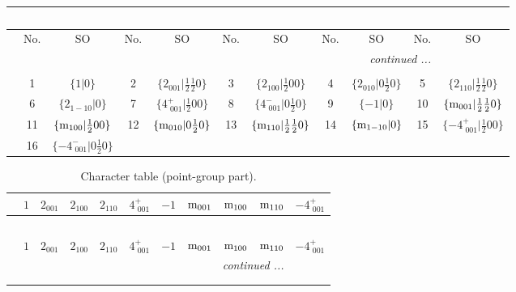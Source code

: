 \documentclass[fleqn,10pt,landscape]{article}
\begin{document}
\begin{itemize}
\begin{center}
\begin{longtable}{c|cc|cc|cc|cc|cc}
\multicolumn{10}{l}{\tablename\ \thetable{}} \\
 \hline \hline
 & No. & SO & No. & SO & No. & SO & No. & SO & No. & SO \\ \hline \endhead

 \hline \hline
\multicolumn{10}{r}{\footnotesize\it continued ...} \\ \endfoot

 \hline \hline
\multicolumn{10}{r}{} \\ \endlastfoot

 & 1 & $\{1|0\}$ & 2 & $\{2{}_{001}|\frac{1}{2} \frac{1}{2} 0\}$ & 3 & $\{2{}_{100}|\frac{1}{2} 0 0\}$ & 4 & $\{2{}_{010}|0 \frac{1}{2} 0\}$ & 5 & $\{2{}_{110}|\frac{1}{2} \frac{1}{2} 0\}$ \\
& 6 & $\{2{}_{1-10}|0\}$ & 7 & $\{4^{+}_{\,\,001}|\frac{1}{2} 0 0\}$ & 8 & $\{4^{-}_{\,\,001}|0 \frac{1}{2} 0\}$ & 9 & $\{-1|0\}$ & 10 & $\{{\rm m}_{001}|\frac{1}{2} \frac{1}{2} 0\}$ \\
& 11 & $\{{\rm m}_{100}|\frac{1}{2} 0 0\}$ & 12 & $\{{\rm m}_{010}|0 \frac{1}{2} 0\}$ & 13 & $\{{\rm m}_{110}|\frac{1}{2} \frac{1}{2} 0\}$ & 14 & $\{{\rm m}_{1-10}|0\}$ & 15 & $\{-4^{+}_{\,\,001}|\frac{1}{2} 0 0\}$ \\
& 16 & $\{-4^{-}_{\,\,001}|0 \frac{1}{2} 0\}$ &  &  &  &  &  &  &  &  \\
\end{longtable}
\end{center}
\begin{center}
\renewcommand{\arraystretch}{1.0}
\begin{longtable}{c|rrrrrrrrrr}
\caption{Character table (point-group part).}
 \\
 \hline \hline
 & $ 1 $ & $ 2{}_{001} $ & $ 2{}_{100} $ & $ 2{}_{110} $ & $ 4^{+}_{\,\,001} $ & $ -1 $ & $ {\rm m}_{001} $ & $ {\rm m}_{100} $ & $ {\rm m}_{110} $ & $ -4^{+}_{\,\,001} $ \\ \hline \endfirsthead

\multicolumn{10}{l}{\tablename\ \thetable{}} \\
 \hline \hline
 & $ 1 $ & $ 2{}_{001} $ & $ 2{}_{100} $ & $ 2{}_{110} $ & $ 4^{+}_{\,\,001} $ & $ -1 $ & $ {\rm m}_{001} $ & $ {\rm m}_{100} $ & $ {\rm m}_{110} $ & $ -4^{+}_{\,\,001} $ \\ \hline \endhead

 \hline \hline
\multicolumn{10}{r}{\footnotesize\it continued ...} \\ \endfoot

 \hline \hline
\multicolumn{10}{r}{} \\ \endlastfoot


\end{longtable}
\end{center}
\end{itemize}
\end{document}
